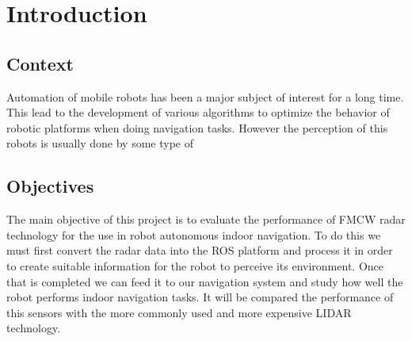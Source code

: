 \chapter{Introduction} \label{ch:introduction}









\section{Context}
Automation of mobile robots has been a major subject of interest for a long time. This lead to the development of various algorithms to optimize the behavior of robotic platforms when doing navigation tasks. However the perception of this robots is usually done by some type of 

\section{Objectives}
The main objective of this project is to evaluate the performance of \ac{FMCW} radar technology for the use in robot autonomous indoor navigation. To do this we must first convert the radar data into the \ac{ROS} platform and process it in order to create suitable information for the robot to perceive its environment. Once that is completed we can feed it to our navigation system and study how well the robot performs indoor navigation tasks.
It will be compared the performance of this sensors with the more commonly used and more expensive \ac{LIDAR} technology.


